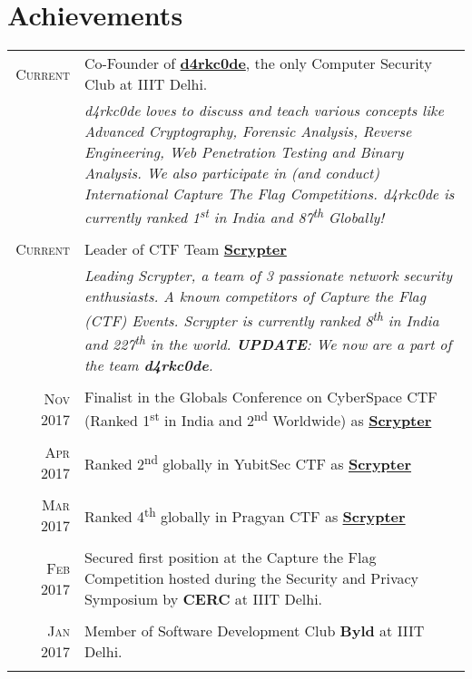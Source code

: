 \documentclass[a4paper,10pt]{article}
\begin{document}
\section{Achievements}
\begin{tabular}{r|p{13.5cm}}
\textsc{Current} & Co-Founder of \href{https://ctftime.org/team/15154}{\textbf{d4rkc0de}}, the only Computer Security Club at IIIT Delhi.  \\
& \emph{\small{d4rkc0de loves to discuss and teach various concepts like Advanced Cryptography, Forensic Analysis, Reverse Engineering, Web Penetration Testing and Binary Analysis. We also participate in (and conduct) International Capture The Flag Competitions. d4rkc0de is currently ranked 1\textsuperscript{st} in India and 87\textsuperscript{th} Globally!}}\\\multicolumn{2}{c}{}\\
\textsc{Current}& Leader of CTF Team \href{https://ctftime.org/team/31353}{\textbf{Scrypter}} \\
& \emph{\small{Leading Scrypter, a team of 3 passionate network security enthusiasts. A known competitors of Capture the Flag (CTF) Events. Scrypter is currently ranked 8\textsuperscript{th} in India and 227\textsuperscript{th} in the world. \textbf{UPDATE}: We now are a part of the team \textbf{d4rkc0de}.}}\\\multicolumn{2}{c}{}\\
 \textsc{Nov} 2017 & Finalist in the Globals Conference on CyberSpace CTF (Ranked 1\textsuperscript{st} in India and 2\textsuperscript{nd} Worldwide) as \href{https://ctftime.org/team/31353}{\textbf{Scrypter}}\\\multicolumn{2}{c}{}\\
\textsc{Apr} 2017 & Ranked 2\textsuperscript{nd} globally in YubitSec CTF as \href{https://ctftime.org/team/31353}{\textbf{Scrypter}}\\\multicolumn{2}{c}{}\\
\textsc{Mar} 2017 & Ranked 4\textsuperscript{th} globally in Pragyan CTF as \href{https://ctftime.org/team/31353}{\textbf{Scrypter}}\\\multicolumn{2}{c}{}\\
\textsc{Feb} 2017 & Secured first position at the Capture the Flag Competition hosted during the Security and Privacy Symposium by \textbf{CERC} at IIIT Delhi.\\\multicolumn{2}{c}{}\\
\textsc{Jan} 2017 & Member of Software Development Club \textbf{Byld} at IIIT Delhi.  \\\multicolumn{2}{c}{}\\

\end{tabular}
\end{document}
